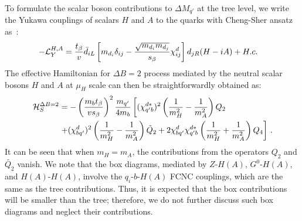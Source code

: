 \documentclass[prd,preprint,superscriptaddress,amsmath,amssymb]{revtex4}
\begin{document}
 To formulate the scalar boson contributions to $\Delta M_{q'}$ at the tree level, we write  the Yukawa couplings of scalars $H$ and $A$ to the quarks with Cheng-Sher ansatz as~\cite{Benbrik:2015evd}:
%
 \begin{align}
-{\cal L}^{H, A}_{Y} &=   \frac{t_\beta}{v} \bar d_{i L} \left[  m_{d_i} \delta_{ij} - \frac{\sqrt{m_{d_i} m_{d_j}}}{ s_\beta} \chi^d_{ij} \right] d_{j R} (H -i A) + H.c. \label{eq:Yu_HA}
\end{align}
The effective Hamiltonian  for $\Delta B=2$ process  mediated by the neutral scalar bosons $H$ and $A$ at $\mu_H$ scale  can then be straightforwardly obtained  as:
 \begin{align}
{\cal H}^{\Delta B=2}_{S} & = - \left( \frac{m_b t_\beta}{v s_\beta}\right)^2  \frac{m_{q'}}{ 4 m_b} \left[ (\chi^{d*}_{q' b})^2  \left( \frac{1}{m^2_H} - \frac{1}{m^2_A} \right) Q_2  \right. \nonumber \\
& \left. + (\chi^d_{bq'} )^2 \left( \frac{1}{m^2_H} - \frac{1}{m^2_A} \right) \tilde Q_2 + 2 \chi^d_{b q' } \chi^{d*}_{q' b}\left( \frac{1}{m^2_H} + \frac{1}{m^2_A} \right) Q_4\right]\,. \label{eq:HDB2S}
 \end{align}
It can be seen that when $m_H= m_A$, the contributions from the operators $Q_2$ and $\tilde{Q_2}$ vanish. We note that the box diagrams, mediated by $Z$-$H(A)$, $G^0$-$H(A)$, and $H(A)$-$H(A)$, involve the  $q_i$-$b$-$H(A)$ FCNC couplings, which are the same as the tree contributions.  Thus, it is expected that the box contributions will be smaller than the tree; therefore, we do not further discuss such box diagrams and neglect their contributions. 
\end{document}
